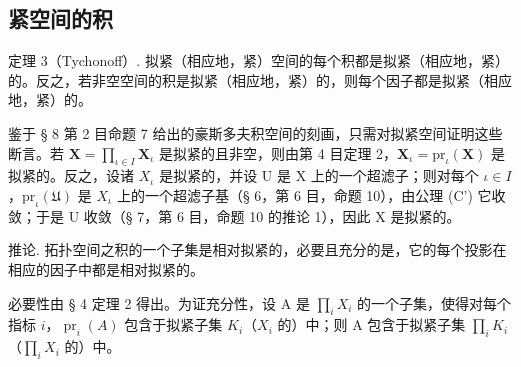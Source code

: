 \subsection{紧空间的积}

定理 3（Tychonoff）. 拟紧（相应地，紧）空间的每个积都是拟紧（相应地，紧）的。反之，若非空空间的积是拟紧（相应地，紧）的，则每个因子都是拟紧（相应地，紧）的。

鉴于 § 8 第 2 目命题 7 给出的豪斯多夫积空间的刻画，只需对拟紧空间证明这些断言。若 \(\mathbf{X} = \prod_{\iota \in I} \mathbf{X}_{\iota}\) 是拟紧的且非空，则由第 4 目定理 2，\(\mathbf{X}_{\iota}=\mathrm{pr}_{\iota}(\mathbf{X})\) 是拟紧的。反之，设诸 \(X_{\iota}\) 是拟紧的，并设 U 是 X 上的一个超滤子；则对每个 \(\iota\in I\)，\(\mathrm{pr}_{\iota}(\mathfrak{U})\) 是 \(X_{\iota}\) 上的一个超滤子基（§ 6，第 6 目，命题 10），由公理 (C') 它收敛；于是 U 收敛（§ 7，第 6 目，命题 10 的推论 1），因此 X 是拟紧的。

推论. 拓扑空间之积的一个子集是相对拟紧的，必要且充分的是，它的每个投影在相应的因子中都是相对拟紧的。

必要性由 § 4 定理 2 得出。为证充分性，设 A 是 \(\prod_{i} X_{i}\) 的一个子集，使得对每个指标 \(i\)，\(\operatorname{pr}_{i}(A)\) 包含于拟紧子集 \(K_{i}\)（\(X_{i}\) 的）中；则 A 包含于拟紧子集 \(\prod_{i} K_{i}\)（\(\prod_{i} X_{i}\) 的）中。

